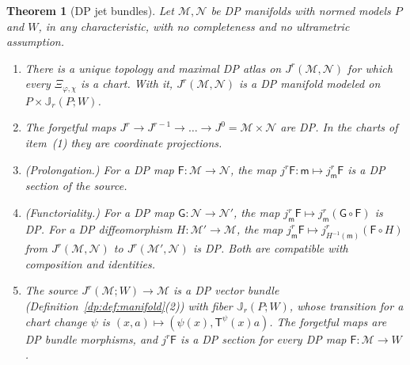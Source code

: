 \documentclass[11pt]{amsart}
\newtheorem{theorem}{Theorem}[section]
\theoremstyle{definition}
\theoremstyle{remark}
\numberwithin{equation}{section}
\theoremstyle{plain}
\theoremstyle{definition}
\theoremstyle{plain}
\begin{document}
\begin{theorem}[DP jet bundles]\label{dp:thm:dp-jets}
Let $\mathcal M,\mathcal N$ be DP manifolds with normed models $P$ and $W$, in any characteristic, with no completeness and no ultrametric assumption.
\begin{enumerate}
\item There is a unique topology and maximal DP atlas on $J^r(\mathcal M,\mathcal N)$ for which every $\Xi_{\varphi,\chi}$ is a chart. With it, $J^r(\mathcal M,\mathcal N)$ is a DP manifold modeled on $P\times\mathbb J_r(P;W)$.
\item The forgetful maps $J^r\to J^{r-1}\to\dots\to J^0=\mathcal M\times\mathcal N$ are DP. In the charts of item~\textup{(1)} they are coordinate projections.
\item \textup{(Prolongation.)} For a DP map $\mathsf F\colon\mathcal M\to\mathcal N$, the map $j^r\mathsf F\colon\mathsf m\mapsto j^r_{\mathsf m}\mathsf F$ is a DP section of the source.
\item \textup{(Functoriality.)} For a DP map $\mathsf G\colon\mathcal N\to\mathcal N'$, the map $j^r_{\mathsf m}\mathsf F\mapsto j^r_{\mathsf m}(\mathsf G\circ\mathsf F)$ is DP. For a DP diffeomorphism $H\colon\mathcal M'\to\mathcal M$, the map $j^r_{\mathsf m}\mathsf F\mapsto j^r_{H^{-1}(\mathsf m)}(\mathsf F\circ H)$ from $J^r(\mathcal M,\mathcal N)$ to $J^r(\mathcal M',\mathcal N)$ is DP. Both are compatible with composition and identities.
\item The source $J^r(\mathcal M;W)\to\mathcal M$ is a DP vector bundle (Definition~\ref{dp:def:manifold}(2)) with fiber $\mathbb J_r(P;W)$, whose transition for a chart change $\psi$ is $(x,a)\mapsto(\psi(x),\mathsf T^\psi(x)a)$. The forgetful maps are DP bundle morphisms, and $j^r\mathsf F$ is a DP section for every DP map $\mathsf F\colon\mathcal M\to W$.
\end{enumerate}
\end{theorem}
\end{document}
